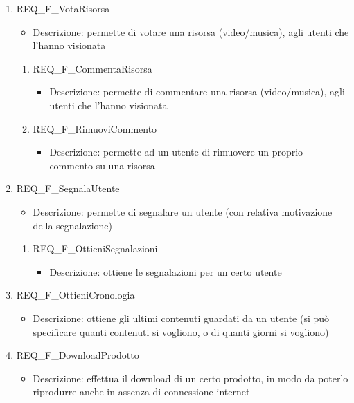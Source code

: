\begin{enumerate}
	\item REQ\_F\_VotaRisorsa
		\begin{itemize}	
			\item Descrizione: permette di votare una risorsa (video/musica), agli utenti che l'hanno visionata
		\end{itemize}
		\begin{enumerate}[label*=\arabic*.]
		\item REQ\_F\_CommentaRisorsa
			\begin{itemize}	
				\item Descrizione: permette di commentare una risorsa (video/musica), agli utenti che l'hanno visionata
			\end{itemize}
		\item REQ\_F\_RimuoviCommento
			\begin{itemize}	
				\item Descrizione: permette ad un utente di rimuovere un proprio commento su una risorsa
			\end{itemize}
		\end{enumerate}
	
	\item REQ\_F\_SegnalaUtente
		\begin{itemize}	
			\item Descrizione: permette di segnalare un utente (con relativa motivazione della segnalazione)
		\end{itemize}
		\begin{enumerate}[label*=\arabic*.]
		\item REQ\_F\_OttieniSegnalazioni
			\begin{itemize}	
				\item Descrizione: ottiene le segnalazioni per un certo utente
			\end{itemize}
		\end{enumerate}

	\item REQ\_F\_OttieniCronologia
		\begin{itemize}	
			\item Descrizione: ottiene gli ultimi contenuti guardati da un utente (si può specificare quanti contenuti si vogliono, o di quanti giorni si vogliono)
		\end{itemize}

	\item REQ\_F\_DownloadProdotto
		\begin{itemize}	
			\item Descrizione: effettua il download di un certo prodotto, in modo da poterlo riprodurre anche in assenza di connessione internet
		\end{itemize}
	

\end{enumerate}
